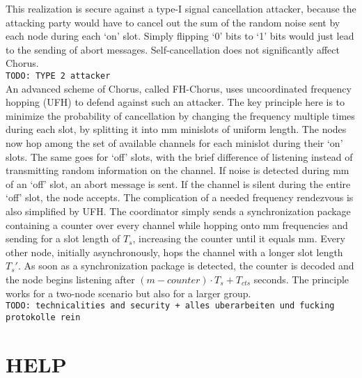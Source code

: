 \documentclass[conference]{IEEEtran}
\begin{document}
This realization is secure against a type-I signal cancellation attacker, because the attacking party would have to cancel out the sum of the random noise sent by each node during each `on' slot. Simply flipping `0' bits to `1' bits would just lead to the sending of abort messages. Self-cancellation does not significantly affect Chorus. \\
\texttt{TODO: TYPE 2 attacker} \\
An advanced scheme of Chorus, called FH-Chorus, uses uncoordinated frequency hopping (UFH) to defend against such an attacker. The key principle here is to minimize the probability of cancellation by changing the frequency multiple times during each slot, by splitting it into mm minislots of uniform length.
The nodes now hop among the set of available channels for each minislot during their `on' slots. The same goes for `off' slots, with the brief difference of listening instead of transmitting random information on the channel. If noise is detected during mm of an `off' slot, an abort message is sent. If the channel is silent during the entire `off' slot, the node accepts.
The complication of a needed frequency rendezvous is also simplified by UFH. The coordinator simply sends a synchronization package containing a counter over every channel while hopping onto mm frequencies and sending for a slot length of $T_s$, increasing the counter until it equals mm. Every other node, initially
asynchronously, hops the channel with a longer slot length $T_s'$. As soon as a synchronization package is detected, the counter is decoded and the node begins listening after $(m-counter) \cdot T_s + T_{cts}$ seconds.
The principle works for a two-node scenario but also for a larger group. \\
\texttt{TODO: technicalities and security + alles uberarbeiten und fucking protokolle rein}

\section{HELP}
\end{document}
